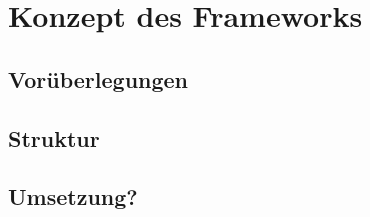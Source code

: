 \chapter{Konzept des Frameworks}
\label{cha:Konzept des Frameworks}

\section{Vorüberlegungen}
\section{Struktur}
\section{Umsetzung?}

